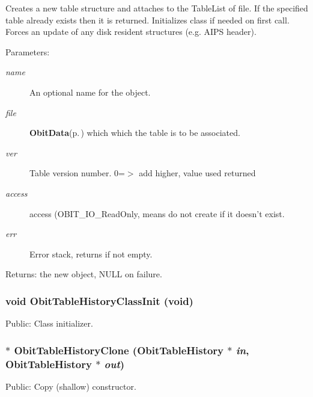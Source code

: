 Creates a new table structure and attaches to the Table\-List of file. If the specified table already exists then it is returned. Initializes class if needed on first call. Forces an update of any disk resident structures (e.g. AIPS header). \begin{Desc}
\item[Parameters:]
\begin{description}
\item[{\em name}]An optional name for the object. \item[{\em file}]{\bf Obit\-Data}{\rm (p.\,\pageref{structObitData})} which which the table is to be associated. \item[{\em ver}]Table version number. 0=$>$ add higher, value used returned \item[{\em access}]access (OBIT\_\-IO\_\-Read\-Only, means do not create if it doesn't exist. \item[{\em err}]Error stack, returns if not empty. \end{description}
\end{Desc}
\begin{Desc}
\item[Returns:]the new object, NULL on failure. \end{Desc}
\subsubsection{\setlength{\rightskip}{0pt plus 5cm}void Obit\-Table\-History\-Class\-Init (void)}\label{ObitTableHistory_8h_a10}


Public: Class initializer. 

\subsubsection{$\ast$ Obit\-Table\-History\-Clone ({\bf Obit\-Table\-History} $\ast$ {\em in}, {\bf Obit\-Table\-History} $\ast$ {\em out})}\label{ObitTableHistory_8h_a15}


Public: Copy (shallow) constructor. 


